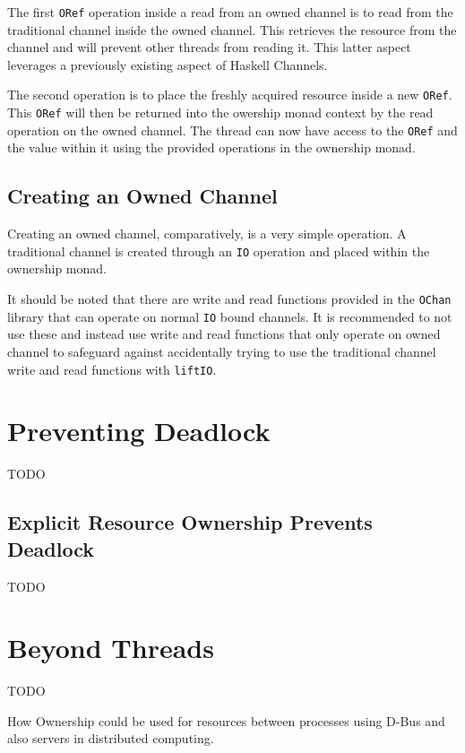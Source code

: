 \documentclass[onehalf,11pt]{beavtex}
\begin{document}
The first \texttt{ORef} operation inside a read from an owned channel
is to read from the traditional channel inside the owned channel. This
retrieves the resource from the channel and will prevent other threads from
reading it. This latter aspect leverages a previously existing aspect of
Haskell Channels. %

The second operation is to place the freshly acquired resource inside a new
\texttt{ORef}.  This \texttt{ORef} will then be returned into the
owership monad context by the read operation on the
owned channel.  The thread can now have access to the \texttt{ORef}
and the value within it using the provided operations in the
ownership monad.


\subsection{Creating an Owned Channel}

Creating an owned channel, comparatively, is a very simple operation.
A traditional channel is created through an \texttt{IO} operation and placed
within the ownership monad.

It should be noted that there are write and read functions provided
in the \texttt{OChan} library that can operate on normal \texttt{IO} bound
channels.  It is recommended to not use these and instead use write and read
functions that only operate on owned channel to safeguard against
accidentally trying to use the traditional channel write and read functions
with \texttt{liftIO}.

\section{Preventing Deadlock}
TODO

\subsection{Explicit Resource Ownership Prevents Deadlock}
TODO

\section{Beyond Threads}

TODO

How Ownership could be used for resources between processes using D-Bus and also
servers in distributed computing.
\end{document}
